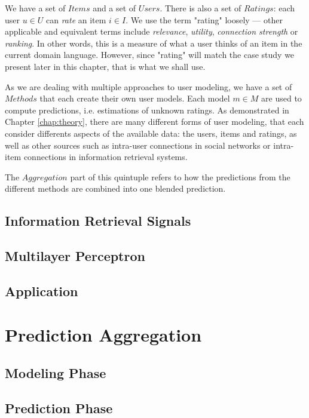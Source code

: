 We have a set of $Items$ and a set of $Users$.
There is also a set of $Ratings$: each user $u \in U$ can \emph{rate} an item $i \in I$.
We use the term "rating" loosely --- other applicable and equivalent terms include \emph{relevance}, \emph{utility},
\emph{connection strength} or \emph{ranking}. In other words, this is a measure of what a user thinks of an item
in the current domain language. However, since "rating" will match the case study we present later in this chapter,
that is what we shall use.

As we are dealing with multiple approaches to user modeling, we have a set of $Methods$ that each create their own
user models. Each model $m \in M$ are used to compute predictions, i.e. estimations of unknown ratings.
As demonstrated in Chapter \ref{chap:theory}, there are many different forms of user modeling,
that each consider differents aspects of the available data: the users, items and ratings, as well as 
other sources such as intra-user connections in social networks or intra-item connections in information retrieval systems.

The $Aggregation$ part of this quintuple refers to how the predictions from the different methods are combined
into one blended prediction. 

\subsection{Information Retrieval Signals}

\subsection{Multilayer Perceptron}

\subsection{Application}



\section{Prediction Aggregation}

\subsection{Modeling Phase}

\subsection{Prediction Phase}

